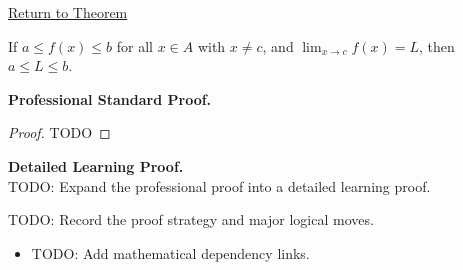\newpage
{}
\label{prf:bounded-limits}

\begin{remark*}[Return]
\hyperref[thm:bounded-limits]{Return to Theorem}
\end{remark*}

\begin{theorem*}
If $a \leq f(x) \leq b$ for all $x \in A$ with $x \neq c$, and $\lim_{x\to c}f(x)=L$, then $a \leq L \leq b$.
\end{theorem*}

\textbf{Professional Standard Proof.}~\\
\begin{proof}
TODO
\end{proof}

\textbf{Detailed Learning Proof.}~\\
TODO: Expand the professional proof into a detailed learning proof.

\begin{remark*}
TODO: Record the proof strategy and major logical moves.
\end{remark*}

\begin{dependencies}
\begin{itemize}
  \item TODO: Add mathematical dependency links.
\end{itemize}
\end{dependencies}
